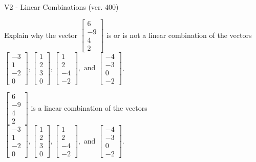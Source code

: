 \begin{exercise}
  \begin{exerciseTitle}V2 - Linear Combinations (ver. 400)\end{exerciseTitle}
  \begin{exerciseStatement}
    Explain why the vector \(\left[\begin{array}{c}
6 \\
-9 \\
4 \\
2
\end{array}\right]\)  is or is not a linear 
	combination of the vectors \(\left[\begin{array}{c}
-3 \\
1 \\
-2 \\
0
\end{array}\right] , \left[\begin{array}{c}
1 \\
2 \\
3 \\
0
\end{array}\right] , \left[\begin{array}{c}
1 \\
2 \\
-4 \\
-2
\end{array}\right] , \text{ and } \left[\begin{array}{c}
-4 \\
-3 \\
0 \\
-2
\end{array}\right]\).
	


  \end{exerciseStatement}
  \begin{exerciseAnswer}
   \(\left[\begin{array}{c}
6 \\
-9 \\
4 \\
2
\end{array}\right]\) 
  	 is  
	a linear combination of the vectors \(\left[\begin{array}{c}
-3 \\
1 \\
-2 \\
0
\end{array}\right] , \left[\begin{array}{c}
1 \\
2 \\
3 \\
0
\end{array}\right] , \left[\begin{array}{c}
1 \\
2 \\
-4 \\
-2
\end{array}\right] , \text{ and } \left[\begin{array}{c}
-4 \\
-3 \\
0 \\
-2
\end{array}\right]\).


\end{exerciseAnswer}
\end{exercise}
